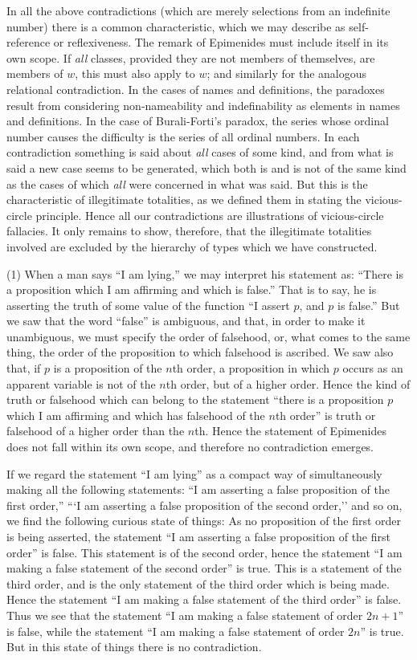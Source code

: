 \documentclass[letterpaper,12pt,openany,leqno]{book}
\newcommand{\pagefirst}[1]{\marginnote[\boxed{\text{#1}}]{\boxed{\text{#1}}}}
\begin{document}
In all the above contradictions (which are merely selections from an indefinite number) there is a common characteristic, which we may describe as self-reference or reflexiveness. The remark of Epimenides must include itself in its own scope. If \textit{all} classes, provided they are not members of themselves, are members of $w$, this must also apply to $w$; and similarly for the analogous relational contradiction. In the cases of names and definitions, the paradoxes result from considering non-nameability and indefinability as elements in names and definitions. In the case of Burali-Forti's paradox, the series whose ordinal number causes the difficulty is the series of all ordinal numbers. In each contradiction something is said about \textit{all} cases of some kind, and from what is said a new case seems to be generated, \pagefirst{65} which both is and is not of the same kind as the cases of which \textit{all} were concerned in what was said. But this is the characteristic of illegitimate totalities, as we defined them in stating the vicious-circle principle. Hence all our contradictions are illustrations of vicious-circle fallacies. It only remains to show, therefore, that the illegitimate totalities involved are excluded by the hierarchy of types which we have constructed.

(1) When a man says ``I am lying,'' we may interpret his statement as: ``There is a proposition which I am affirming and which is false.'' That is to say, he is asserting the truth of some value of the function ``I assert $p$, and $p$ is false.'' But we saw that the word ``false'' is ambiguous, and that, in order to make it unambiguous, we must specify the order of falsehood, or, what comes to the same thing, the order of the proposition to which falsehood is ascribed. We saw also that, if $p$ is a proposition of the $n$th order, a proposition in which $p$ occurs as an apparent variable is not of the $n$th order, but of a higher order. Hence the kind of truth or falsehood which can belong to the statement ``there is a proposition $p$ which I am affirming and which has falsehood of the $n$th order'' is truth or falsehood of a higher order than the $n$th. Hence the statement of Epimenides does not fall within its own scope, and therefore no contradiction emerges. 

If we regard the statement ``I am lying'' as a compact way of simultaneously making all the following statements: ``I am asserting a false proposition of the first order,'' ```I am asserting a false proposition of the second order,'' and so on, we find the following curious state of things: As no proposition of the first order is being asserted, the statement ``I am asserting a false proposition of the first order'' is false. This statement is of the second order, hence the statement ``I am making a false statement of the second order'' is true. This is a statement of the third order, and is the only statement of the third order which is being made. Hence the statement ``I am making a false statement of the third order'' is false. Thus we see that the statement ``I am making a false statement of order $2n+1$'' is false, while the statement ``I am making a false statement of order $2n$'' is true. But in this state of things there is no contradiction.
\end{document}
